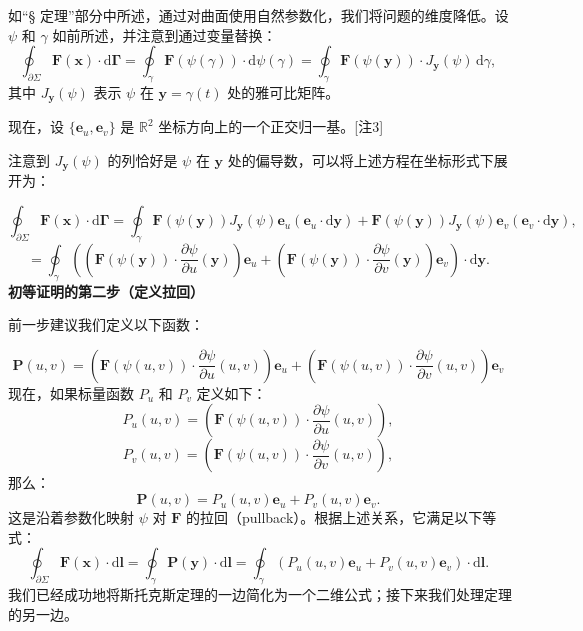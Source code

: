 如“§ 定理”部分中所述，通过对曲面使用自然参数化，我们将问题的维度降低。设 \(\psi\) 和 \(\gamma\) 如前所述，并注意到通过变量替换：
\[
\oint_{\partial \Sigma} \mathbf{F}(\mathbf{x}) \cdot \mathrm{d} \mathbf{\Gamma} 
= \oint_{\gamma} \mathbf{F}(\psi(\gamma)) \cdot \mathrm{d} \psi(\gamma) 
= \oint_{\gamma} \mathbf{F}(\psi(\mathbf{y})) \cdot J_{\mathbf{y}}(\psi) \, \mathrm{d} \gamma,~
\]
其中 \(J_{\mathbf{y}}(\psi)\) 表示 \(\psi\) 在 \(\mathbf{y} = \gamma(t)\) 处的雅可比矩阵。

现在，设 \(\{ \mathbf{e}_u, \mathbf{e}_v \}\) 是 \(\mathbb{R}^2\) 坐标方向上的一个正交归一基。[注3]

注意到 \(J_{\mathbf{y}}(\psi)\) 的列恰好是 \(\psi\) 在 \(\mathbf{y}\) 处的偏导数，可以将上述方程在坐标形式下展开为：

\[
\oint_{\partial \Sigma} \mathbf{F}(\mathbf{x}) \cdot \mathrm{d} \mathbf{\Gamma} 
= \oint_{\gamma} \mathbf{F}(\psi(\mathbf{y})) J_{\mathbf{y}}(\psi) \mathbf{e}_u (\mathbf{e}_u \cdot \mathrm{d} \mathbf{y}) 
+ \mathbf{F}(\psi(\mathbf{y})) J_{\mathbf{y}}(\psi) \mathbf{e}_v (\mathbf{e}_v \cdot \mathrm{d} \mathbf{y}),~
\]
\[
=\oint_{\gamma} \left( 
\left( \mathbf{F}(\psi(\mathbf{y})) \cdot \frac{\partial \psi}{\partial u}(\mathbf{y}) \right) \mathbf{e}_u 
+ \left( \mathbf{F}(\psi(\mathbf{y})) \cdot \frac{\partial \psi}{\partial v}(\mathbf{y}) \right) \mathbf{e}_v 
\right) \cdot \mathrm{d} \mathbf{y}.~
\]
\textbf{初等证明的第二步（定义拉回）}

前一步建议我们定义以下函数：

\[
\mathbf{P}(u, v) = \left( \mathbf{F}(\psi(u, v)) \cdot \frac{\partial {\psi}}{\partial u}(u, v) \right) \mathbf{e}_u + \left( \mathbf{F}(\psi(u, v)) \cdot \frac{\partial \psi}{\partial v}(u, v) \right) \mathbf{e}_v~
\]
现在，如果标量函数 \(P_u\) 和 \(P_v\) 定义如下：
\[
P_u(u, v) = \left( \mathbf{F}(\psi(u, v)) \cdot \frac{\partial \psi}{\partial u}(u, v) \right),~
\]
\[
P_v(u, v) = \left( \mathbf{F}(\psi(u, v)) \cdot \frac{\partial \psi}{\partial v}(u, v) \right),~
\]
那么：
\[
\mathbf{P}(u, v) = P_u(u, v) \mathbf{e}_u + P_v(u, v) \mathbf{e}_v.~
\]
这是沿着参数化映射 \(\psi\) 对 \(\mathbf{F}\) 的拉回（pullback）。根据上述关系，它满足以下等式：
\[
\oint_{\partial \Sigma} \mathbf{F}(\mathbf{x}) \cdot \mathrm{d} \mathbf{l} 
= \oint_{\gamma} \mathbf{P}(\mathbf{y}) \cdot \mathrm{d} \mathbf{l} 
= \oint_{\gamma} \left( P_u(u, v) \mathbf{e}_u + P_v(u, v) \mathbf{e}_v \right) \cdot \mathrm{d} \mathbf{l}.~
\]
我们已经成功地将斯托克斯定理的一边简化为一个二维公式；接下来我们处理定理的另一边。